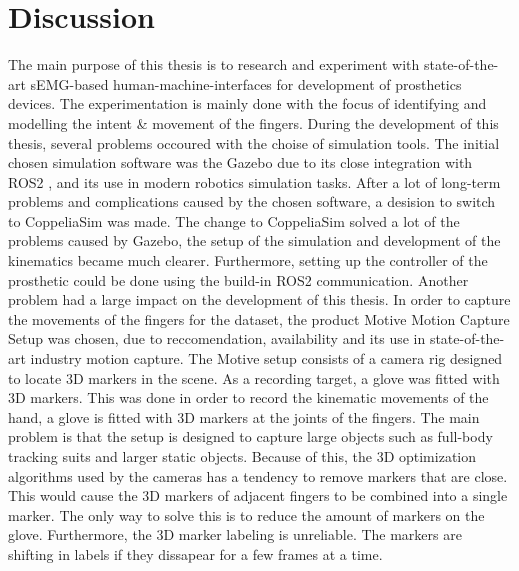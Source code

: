 \documentclass[../main.tex]{subfiles}
\begin{document}
\section{Discussion}

The main purpose of this thesis is to research and experiment with state-of-the-art sEMG-based human-machine-interfaces for development of prosthetics devices.
The experimentation is mainly done with the focus of identifying and modelling the intent \& movement of the fingers.
During the development of this thesis, several problems occoured with the choise of simulation tools.
The initial chosen simulation software was the Gazebo \cite{gazebo} due to its close integration with ROS2 \cite{ros2}, and its use in modern robotics simulation tasks.
After a lot of long-term problems and complications caused by the chosen software, a desision to switch to CoppeliaSim \cite{coppeliasim} was made.
The change to CoppeliaSim solved a lot of the problems caused by Gazebo, the setup of the simulation and development of the kinematics became much clearer.
Furthermore, setting up the controller of the prosthetic could be done using the build-in ROS2 communication.
Another problem had a large impact on the development of this thesis.
In order to capture the movements of the fingers for the dataset, the product Motive Motion Capture Setup \cite{motive} was chosen, due to reccomendation, availability and its use in state-of-the-art industry motion capture.
The Motive setup consists of a camera rig designed to locate 3D markers in the scene.
As a recording target, a glove was fitted with 3D markers.
This was done in order to record the kinematic movements of the hand, a glove is fitted with 3D markers at the joints of the fingers.
The main problem is that the setup is designed to capture large objects such as full-body tracking suits and larger static objects.
Because of this, the 3D optimization algorithms used by the cameras has a tendency to remove markers that are close. 
This would cause the 3D markers of adjacent fingers to be combined into a single marker.
The only way to solve this is to reduce the amount of markers on the glove.
Furthermore, the 3D marker labeling is unreliable.
The markers are shifting in labels if they dissapear for a few frames at a time.
\end{document}
